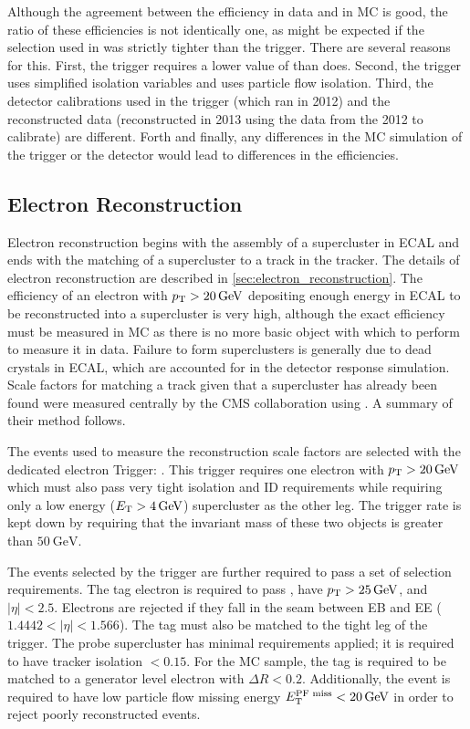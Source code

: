 Although the agreement between the efficiency in data and in MC is good, the
ratio of these efficiencies is not identically one, as might be expected if the
selection used in \TnP was strictly tighter than the trigger. There are several
reasons for this. First, the trigger requires a lower value of \HOverE than
\EGTIGHT does. Second, the trigger uses simplified isolation variables and
\EGTIGHT uses particle flow isolation. Third, the detector calibrations used in
the trigger (which ran in 2012) and the reconstructed data (reconstructed in
2013 using the data from the 2012 to calibrate) are different. Forth and
finally, any differences in the MC simulation of the trigger or the detector
would lead to differences in the efficiencies.

\subsection{Electron Reconstruction}
\label{ssec:sf_reconstruction}

Electron reconstruction begins with the assembly of a supercluster in ECAL and
ends with the matching of a supercluster to a track in the tracker. The details
of electron reconstruction are described in \cref{sec:electron_reconstruction}.
The efficiency of an electron with $\pt > \SI{20}{\GeV}$ depositing enough
energy in ECAL to be reconstructed into a supercluster is very high, although
the exact efficiency must be measured in MC as there is no more basic object
with which to perform \TnP to measure it in data. Failure to form superclusters
is generally due to dead crystals in ECAL, which are accounted for in the
detector response simulation. Scale factors for matching a track given that a
supercluster has already been found were measured centrally by the CMS
collaboration using \TnP \cite{gsf_scale_factors_2013}. A summary of their
method follows.

The events used to measure the reconstruction scale factors are selected with
the dedicated electron \TnP Trigger: \TnPTrigger. This trigger requires one
electron with $\pt > \SI{20}{\GeV}$ which must also pass very tight isolation
and ID requirements while requiring only a low energy ($\et > \SI{4}{\GeV}$)
supercluster as the other leg. The trigger rate is kept down by requiring that
the invariant mass of these two objects is greater than $\SI{50}{\GeV}$.

The events selected by the trigger are further required to pass a set of
selection requirements. The tag electron is required to pass \EGTIGHT, have
$\pt > \SI{25}{\GeV}$, and $|\eta| < 2.5$. Electrons are rejected if they fall
in the seam between EB and EE ($1.4442 < |\eta| < 1.566$). The tag must also be
matched to the tight leg of the \TnP trigger. The probe supercluster has
minimal requirements applied; it is required to have tracker isolation $<
0.15$. For the MC sample, the tag is required to be matched to a generator
level electron with $\Delta R < 0.2$. Additionally, the event is required to
have low particle flow missing energy $\PFMET < \SI{20}{\GeV}$ in order to
reject poorly reconstructed events.

